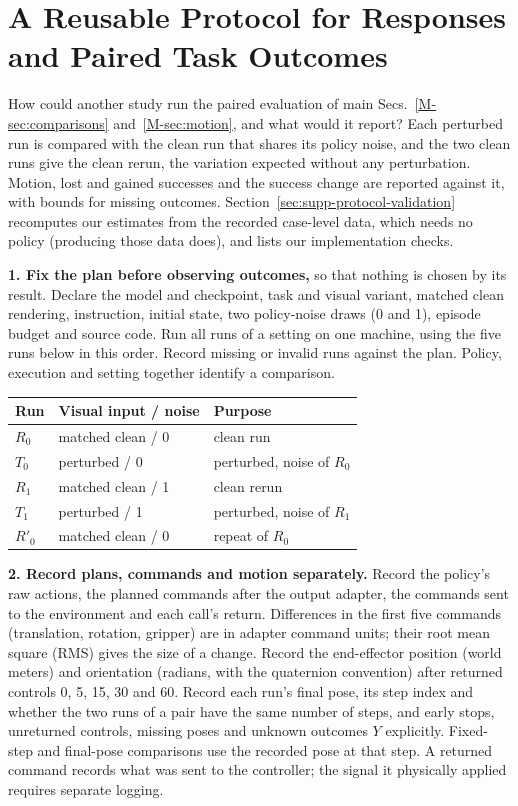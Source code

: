 \section{A Reusable Protocol for Responses and Paired Task Outcomes}
\label{sec:supp-protocol-card}
How could another study run the paired evaluation of main Secs.~\ref*{M-sec:comparisons} and~\ref*{M-sec:motion}, and what would it report? Each perturbed run is compared with the clean run that shares its policy noise, and the two clean runs give the clean rerun, the variation expected without any perturbation. Motion, lost and gained successes and the success change are reported against it, with bounds for missing outcomes. Section~\ref{sec:supp-protocol-validation} recomputes our estimates from the recorded case-level data, which needs no policy (producing those data does), and lists our implementation checks.

\noindent\textbf{1. Fix the plan before observing outcomes,} so that nothing is chosen by its result. Declare the model and checkpoint, task and visual variant, matched clean rendering, instruction, initial state, two policy-noise draws (0 and 1), episode budget and source code. Run all runs of a setting on one machine, using the five runs below in this order. Record missing or invalid runs against the plan. Policy, execution and setting together identify a comparison.

\begin{table}[!htb]\centering\small
\begin{tabular}{lll}
\toprule Run & Visual input / noise & Purpose\\\midrule
$R_0$ & matched clean / 0 & clean run\\
$T_0$ & perturbed / 0 & perturbed, noise of $R_0$\\
$R_1$ & matched clean / 1 & clean rerun\\
$T_1$ & perturbed / 1 & perturbed, noise of $R_1$\\
$R'_0$ & matched clean / 0 & repeat of $R_0$\\
\bottomrule
\end{tabular}
\end{table}

\noindent\textbf{2. Record plans, commands and motion separately.} Record the policy's raw actions, the planned commands after the output adapter, the commands sent to the environment and each call's return. Differences in the first five commands (translation, rotation, gripper) are in adapter command units; their root mean square (RMS) gives the size of a change. Record the end-effector position (world meters) and orientation (radians, with the quaternion convention) after returned controls 0, 5, 15, 30 and 60. Record each run's final pose, its step index and whether the two runs of a pair have the same number of steps, and early stops, unreturned controls, missing poses and unknown outcomes $Y$ explicitly. Fixed-step and final-pose comparisons use the recorded pose at that step. A returned command records what was sent to the controller; the signal it physically applied requires separate logging.

